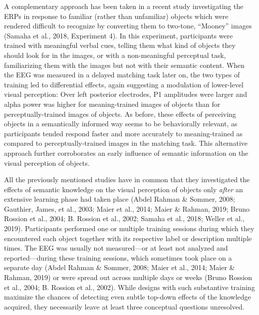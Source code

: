 \documentclass[
  english,
  man,12pt,twoside]{apa7}
\begin{document}
A complementary approach has been taken in a recent study investigating the ERPs in response to familiar (rather than unfamiliar) objects which were rendered difficult to recognize by converting them to two-tone, ``Mooney'' images (Samaha et al., 2018, Experiment 4). In this experiment, participants were trained with meaningful verbal cues, telling them what kind of objects they should look for in the images, or with a non-meaningful perceptual task, familiarizing them with the images but not with their semantic content. When the EEG was measured in a delayed matching task later on, the two types of training led to differential effects, again suggesting a modulation of lower-level visual perception: Over left posterior electrodes, P1 amplitudes were larger and alpha power was higher for meaning-trained images of objects than for perceptually-trained images of objects. As before, these effects of perceiving objects in a semantically informed way seems to be behaviorally relevant, as participants tended respond faster and more accurately to meaning-trained as compared to perceptually-trained images in the matching task. This alternative approach further corroborates an early influence of semantic information on the visual perception of objects.

All the previously mentioned studies have in common that they investigated the effects of semantic knowledge on the visual perception of objects only \emph{after} an extensive learning phase had taken place (Abdel Rahman \& Sommer, 2008; Gauthier, James, et al., 2003; Maier et al., 2014; Maier \& Rahman, 2019; Bruno Rossion et al., 2004; B. Rossion et al., 2002; Samaha et al., 2018; Weller et al., 2019). Participants performed one or multiple training sessions during which they encountered each object together with its respective label or description multiple times. The EEG was usually not measured---or at least not analyzed and reported---during these training sessions, which sometimes took place on a separate day (Abdel Rahman \& Sommer, 2008; Maier et al., 2014; Maier \& Rahman, 2019) or were spread out across multiple days or weeks (Bruno Rossion et al., 2004; B. Rossion et al., 2002). While designs with such substantive training maximize the chances of detecting even subtle top-down effects of the knowledge acquired, they necessarily leave at least three conceptual questions unresolved.
\end{document}
